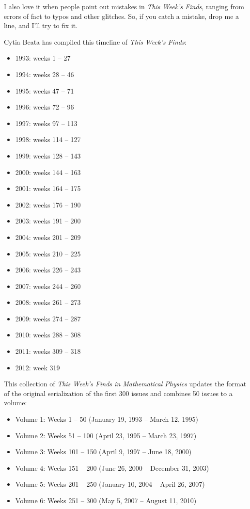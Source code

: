 I also love it when people point out mistakes in \emph{This Week's Finds}, ranging from errors of fact to typos and other glitches. So, if you catch a mistake, drop me a line, and I'll try to fix it.

Cytia Beata has compiled this timeline of \emph{This Week's Finds}:

\begin{itemize}
\item 1993: weeks 1 -- 27
\item 1994: weeks 28 -- 46
\item 1995: weeks 47 -- 71
\item 1996: weeks 72 -- 96
\item 1997: weeks 97 -- 113
\item 1998: weeks 114 -- 127
\item 1999: weeks 128 -- 143
\item 2000: weeks 144 -- 163
\item 2001: weeks 164 -- 175
\item 2002: weeks 176 -- 190
\item 2003: weeks 191 -- 200
\item 2004: weeks 201 -- 209
\item 2005: weeks 210 -- 225
\item 2006: weeks 226 -- 243
\item 2007: weeks 244 -- 260
\item 2008: weeks 261 -- 273
\item 2009: weeks 274 -- 287
\item 2010: weeks 288 -- 308
\item 2011: weeks 309 -- 318
\item 2012: week 319
\end{itemize}
This collection of \emph{This Week's Finds in Mathematical Physics} updates the format of the original serialization of the first 300 issues and combines 50 issues to a volume:

\begin{itemize}
\item Volume 1: Weeks 1 -- 50 (January 19, 1993 -- March 12, 1995)
\item Volume 2: Weeks 51 -- 100 (April 23, 1995 -- March 23, 1997)
\item Volume 3: Weeks 101 -- 150 (April 9, 1997 -- June 18, 2000)
\item Volume 4: Weeks 151 -- 200 (June 26, 2000 -- December 31, 2003)
\item Volume 5: Weeks 201 -- 250 (January 10, 2004 -- April 26, 2007)
\item Volume 6: Weeks 251 -- 300 (May 5, 2007 -- August 11, 2010)
\end{itemize}
\newpage

\tableofcontents
\newpage
